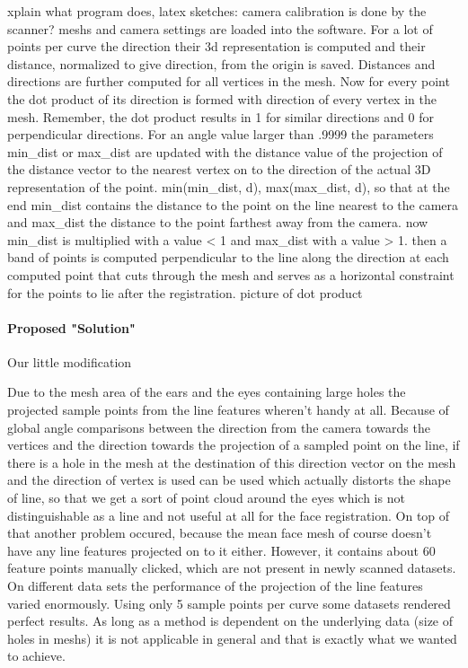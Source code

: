 xplain what program does, latex sketches:
camera calibration is done by the scanner?
meshs and camera settings are loaded into the software. For a lot of points per curve the direction their 3d representation is computed and their distance, normalized to give direction,  from the origin is saved. Distances and directions are further computed for all vertices in the mesh. Now for every point the dot product of its direction is formed with direction of every vertex in the mesh. Remember, the dot product results in 1 for similar directions and 0 for perpendicular directions.
For an angle value larger than .9999 the parameters min_dist or max_dist are updated with the distance value of the projection of the distance vector to the nearest vertex on to the direction of the actual 3D representation of the point. min(min_dist, d), max(max_dist, d), so that at the end min_dist contains the distance to the point on the line nearest to the camera and max_dist the distance to the point farthest away from the camera. now min_dist is multiplied with a value < 1 and
max_dist with a value > 1. 
then a band of points is computed perpendicular to the line along the direction at each computed point that cuts through the mesh and serves as a horizontal constraint for the points to lie after the registration.
picture of dot product

\paragraph{Proposed "Solution"}
Our little modification

Due to the mesh area of the ears and the eyes containing large holes the projected sample points from the line features wheren't handy at all. Because of global angle comparisons between the direction from the camera towards the vertices and the direction towards the projection of a sampled point on the line, if there is a hole in the mesh at the destination of this direction vector on the mesh and the direction of vertex is used can be used which actually distorts the shape of line,
so that we get a sort of point cloud around the eyes which is not distinguishable as a line and not useful at all for the face registration. On top of that another problem occured, because the mean face mesh of course doesn't have any line features projected on to it either. However, it contains about 60 feature points manually clicked, which are not present in newly scanned datasets. 
On different data sets the performance of the projection of the line features varied enormously. Using only 5 sample points per curve some datasets rendered perfect results. As long as a method is dependent on the underlying data (size of holes in meshs) it is not applicable in general and that is exactly what we wanted to achieve.

